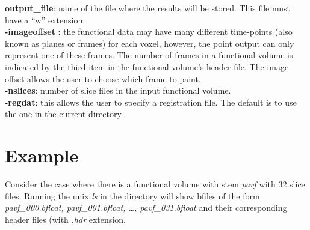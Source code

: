\documentclass[10pt]{article}
\begin{document}
\noindent
{\bf output\_file}: name of the file where the results will be stored.
This file must have a ``w'' extension.\\

\noindent
{\bf -imageoffset }: the functional data may have many different
time-points (also known as planes or frames) for each voxel, however,
the point output can only represent one of these frames.  The number
of frames in a functional volume is indicated by the third item in the
functional volume's header file.  The image offset allows the user to
choose which frame to paint.\\

\noindent
{\bf -nslices}:  number of slice files in the input functional volume.\\

\noindent
{\bf -regdat}: this allows the user to specify a registration file.
The default is to use the one in the current directory.\\

\section{Example}

Consider the case where there is a functional volume with stem {\em
pavf} with 32 slice files.  Running the unix {\em ls} in the directory
will show bfiles of the form {\em pavf\_000.bfloat, pavf\_001.bfloat,
\ldots, pavf\_031.bfloat} and their corresponding header files (with
{\em .hdr} extension.
\end{document}
